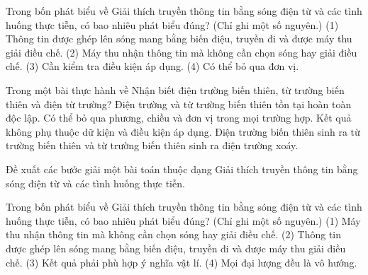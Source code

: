 \begin{ex}
Trong bốn phát biểu về Giải thích truyền thông tin bằng sóng điện từ và các tình huống thực tiễn, có bao nhiêu phát biểu đúng? (Chỉ ghi một số nguyên.) (1) Thông tin được ghép lên sóng mang bằng biến điệu, truyền đi và được máy thu giải điều chế. (2) Máy thu nhận thông tin mà không cần chọn sóng hay giải điều chế. (3) Cần kiểm tra điều kiện áp dụng. (4) Có thể bỏ qua đơn vị.
\end{ex}

\begin{ex}
Trong một bài thực hành về Nhận biết điện trường biến thiên, từ trường biến thiên và điện từ trường?
\choice
{Điện trường và từ trường biến thiên tồn tại hoàn toàn độc lập.}
{Có thể bỏ qua phương, chiều và đơn vị trong mọi trường hợp.}
{Kết quả không phụ thuộc dữ kiện và điều kiện áp dụng.}
{\True Điện trường biến thiên sinh ra từ trường biến thiên và từ trường biến thiên sinh ra điện trường xoáy.}
\end{ex}

\begin{bt}
Đề xuất các bước giải một bài toán thuộc dạng Giải thích truyền thông tin bằng sóng điện từ và các tình huống thực tiễn.
\end{bt}

\begin{ex}
Trong bốn phát biểu về Giải thích truyền thông tin bằng sóng điện từ và các tình huống thực tiễn, có bao nhiêu phát biểu đúng? (Chỉ ghi một số nguyên.) (1) Máy thu nhận thông tin mà không cần chọn sóng hay giải điều chế. (2) Thông tin được ghép lên sóng mang bằng biến điệu, truyền đi và được máy thu giải điều chế. (3) Kết quả phải phù hợp ý nghĩa vật lí. (4) Mọi đại lượng đều là vô hướng.
\end{ex}

